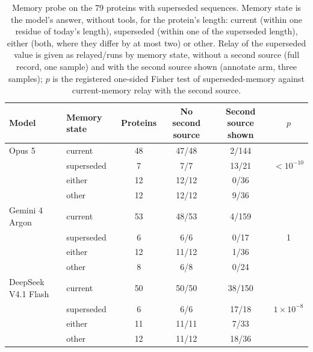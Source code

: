 \documentclass[11pt]{article}
\begin{document}
\begin{table}[h]
\centering\small
\caption{Memory probe on the 79 proteins with superseded sequences. Memory state is the model's answer, without tools, for the protein's length: current (within one residue of today's length), superseded (within one of the superseded length), either (both, where they differ by at most two) or other. Relay of the superseded value is given as relayed/runs by memory state, without a second source (full record, one sample) and with the second source shown (annotate arm, three samples); $p$ is the registered one-sided Fisher test of superseded-memory against current-memory relay with the second source.}
\begin{tabular}{llcccc}
\toprule
Model & Memory state & Proteins & No second source & Second source shown & $p$ \\
\midrule
Opus 5 & current & 48 & 47/48 & 2/144 & \\
 & superseded & 7 & 7/7 & 13/21 & $<10^{-10}$ \\
 & either & 12 & 12/12 & 0/36 & \\
 & other & 12 & 12/12 & 9/36 & \\
Gemini 4 Argon & current & 53 & 48/53 & 4/159 & \\
 & superseded & 6 & 6/6 & 0/17 & 1 \\
 & either & 12 & 11/12 & 1/36 & \\
 & other & 8 & 6/8 & 0/24 & \\
DeepSeek V4.1 Flash & current & 50 & 50/50 & 38/150 & \\
 & superseded & 6 & 6/6 & 17/18 & $1 \times 10^{-8}$ \\
 & either & 11 & 11/11 & 7/33 & \\
 & other & 12 & 11/12 & 18/36 & \\
\bottomrule
\end{tabular}
\end{table}
\end{document}
